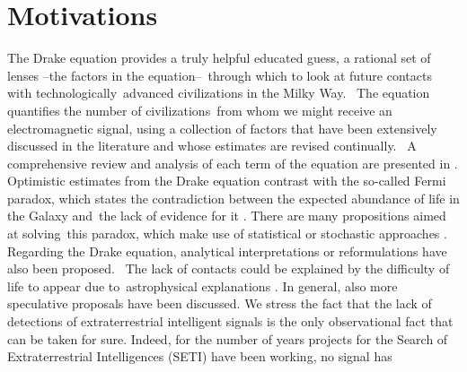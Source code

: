 \documentclass[crop]{CSLB}
\begin{document}
\maketitle


\section{Motivations}\label{S_motivations}

The Drake equation  \citep{drake_intelligent_1962} provides a truly
helpful educated guess, a rational set of lenses --the factors in the
equation-- through which to look at future contacts with
technologically advanced civilizations in the Milky Way. 
%
The equation quantifies the number of civilizations from whom we might
receive an electromagnetic signal, using a collection of factors that
have been extensively discussed in the literature and whose estimates
are revised continually. 
%
A comprehensive review and analysis of each term of the equation are
presented in \citet{vakoch_drake_2015}.
%
Optimistic estimates from the Drake equation contrast with the
so-called Fermi paradox, which states the contradiction between the
expected abundance of life in the Galaxy and the lack of evidence for
it \citep[e.g. ][]{hart_explanation_1975, brin_great_1983,
barlow_galactic_2012, forgan_galactic_2016, vanhouten_isthere_2017,
Sotos_biotechnology_2019, carroll_nellemback_fermi_2019}.
%
There are many propositions aimed at solving this paradox, which make
use of statistical \citep{solomonides_probabilistic_2016,
vanhouten_isthere_2017, horvat_calculating_2007,
maccone_statistical_2015} or stochastic approaches
\citep{forgan_numerical_2009, bloetscher_using_2019,
glade_stochastic_2011, forgan_numerical_2010}.
%
Regarding the Drake equation, analytical interpretations
\citep{prantzos_joint_2013, smith_broadcasting_2009} or reformulations
\citep[][and references therein]{burchell_whither_2006} have also been
proposed. 
%
The lack of contacts could be explained by the difficulty of life to
appear due to astrophysical explanations
\citep{annis_astrophysical_1999}.
%
In general, also more speculative proposals
\citep{barlow_galactic_2013, lampton_information_2013,
conway_three_2018, forgan_galactic_2017} have been discussed.
% 
We stress the fact that the lack of detections of extraterrestrial
intelligent signals is the only observational fact that can be taken
for sure.
%
Indeed, for the number of years projects for the Search of
Extraterrestrial Intelligences (SETI) have been working, no signal has
\end{document}
